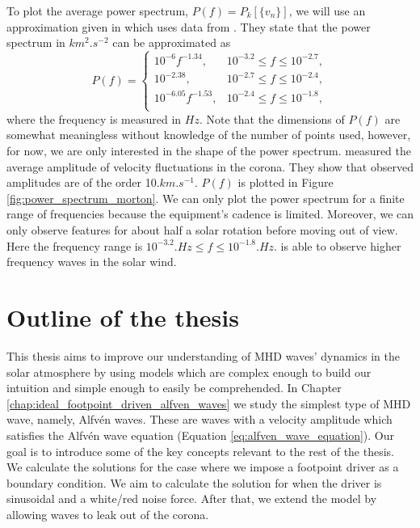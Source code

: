 To plot the average power spectrum, $P(f)=P_k[\{v_n\}]$, we will use an approximation given in \citet{Pagano2019} which uses data from \citet{Morton2016}. They state that the power spectrum in $\si{km^2.s^{-2}}$ can be approximated as
\begin{equation}
    P(f) = \begin{cases}
    10^{-6}f^{-1.34},     & 10^{-3.2} \le f \le 10^{-2.7}, \\
    10^{-2.38},           & 10^{-2.7} \le f \le 10^{-2.4}, \\
    10^{-6.05}f^{-1.53}, & 10^{-2.4} \le f \le 10^{-1.8}, \\
    \end{cases}
\end{equation}
where the frequency is measured in $\si{Hz}$. 
Note that the dimensions of $P(f)$ are somewhat meaningless without knowledge of the number of points used, however, for now, we are only interested in the shape of the power spectrum. \cite{McIntosh2011,McIntosh2012}  measured the average amplitude of velocity fluctuations in the corona. They show that observed amplitudes are of the order 10$\si{.km.s^{-1}}$. $P(f)$ is plotted in Figure \ref{fig:power_spectrum_morton}. We can only plot the power spectrum for a finite range of frequencies because the equipment’s cadence is limited. Moreover, we can only observe features for about half a solar rotation before moving out of view. Here the frequency range is $10^{-3.2}\si{.Hz} \le f \le 10^{-1.8}\si{.Hz}$. \citet{Podesta2007} is able to observe higher frequency waves in the solar wind.

\section{Outline of the thesis}

This thesis aims to improve our understanding of MHD waves' dynamics in the solar atmosphere by using models which are complex enough to build our intuition and simple enough to easily be comprehended. In Chapter \ref{chap:ideal_footpoint_driven_alfven_waves} we study the simplest type of MHD wave, namely, Alfv\'en waves. These are waves with a velocity amplitude which satisfies the Alfv\'en wave equation (Equation \ref{eq:alfven_wave_equation}). Our goal is to introduce some of the key concepts relevant to the rest of the thesis. We calculate the solutions for the case where we impose a footpoint driver as a boundary condition. We aim to calculate the solution for when the driver is sinusoidal and a white/red noise force. After that, we extend the model by allowing waves to leak out of the corona.

